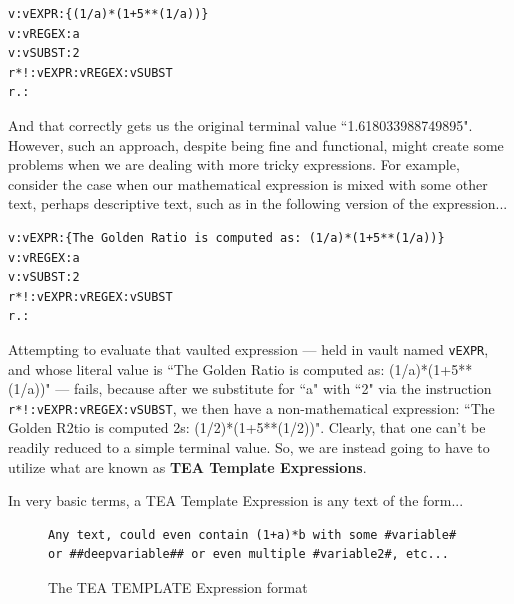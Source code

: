 \documentclass[a4paper, 18pt]{book} %
\begin{document}
{{{  \begin{tcolorbox}[teaterminalstyle, title=R: EXAMPLE 8: Using R.:, breakable]
  \begin{lstlisting}[language=TEA,breaklines=true,]
v:vEXPR:{(1/a)*(1+5**(1/a))}
v:vREGEX:a
v:vSUBST:2
r*!:vEXPR:vREGEX:vSUBST
r.:
   \end{lstlisting}
  \end{tcolorbox}

\vspace{1em}

And that correctly gets us the original terminal value ``1.618033988749895". However, such an approach, despite being fine and functional, might create some problems when  we are dealing with more tricky expressions. For example, consider the case when our mathematical expression is mixed with some other text, perhaps descriptive text, such as in the following version of the expression...


\vspace{1em}

  \begin{tcolorbox}[teaterminalstyle, title=R: EXAMPLE 8: Using R.:, breakable]
  \begin{lstlisting}[language=TEA,breaklines=true,]
v:vEXPR:{The Golden Ratio is computed as: (1/a)*(1+5**(1/a))}
v:vREGEX:a
v:vSUBST:2
r*!:vEXPR:vREGEX:vSUBST
r.:
   \end{lstlisting}
  \end{tcolorbox}

\vspace{1em}


Attempting to evaluate that vaulted expression --- held in vault named \texttt{vEXPR}, and whose literal value is ``The Golden Ratio is computed as: (1/a)*(1+5**(1/a))" --- fails, because after we substitute for ``a" with ``2" via the instruction \texttt{r*!:vEXPR:vREGEX:vSUBST}, we then have a non-mathematical expression: ``The Golden R2tio is computed 2s: (1/2)*(1+5**(1/2))". Clearly, that one can't be readily reduced to a simple terminal value. So, we are instead going to have to utilize what are known as \textbf{TEA Template Expressions}.


\vspace{2em}

In very basic terms, a TEA Template Expression is any text of the form...

\vspace{2em}

\begin{figure}[H]
  \centering
  \begin{tcolorbox}[myterminalstyle, title=TEA TEMPLATE Expression Format]
  \begin{lstlisting}
Any text, could even contain (1+a)*b with some #variable# or ##deepvariable## or even multiple #variable2#, etc...
  \end{lstlisting}
  \end{tcolorbox}
  \caption{The TEA TEMPLATE Expression format}
  \label{FIGTEATEMPL}
\end{figure}


}}}
\end{document}
